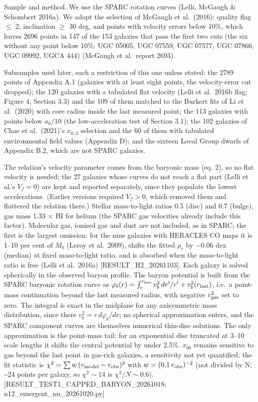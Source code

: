 \documentclass[
  10pt,
]{article}
\begin{document}
Sample and method. We use the SPARC rotation curves (Lelli, McGaugh \& Schombert 2016a). We adopt the selection of McGaugh et al.~(2016): quality flag $\le$ 2, inclination $\ge$ 30 deg, and points with velocity errors below 10\%, which leaves 2696 points in 147 of the 153 galaxies that pass the first two cuts (the six without any point below 10\%: UGC 05005, UGC 07559, UGC 07577, UGC 07866, UGC 09992, UGCA 444) (McGaugh et al.\ report 2693).

Subsamples used later, each a restriction of this one unless stated: the 2789 points of Appendix A.1 (galaxies with at least eight points, the velocity-error cut dropped); the 120 galaxies with a tabulated flat velocity (Lelli et al.~2016b flag; Figure 4, Section 3.3) and the 109 of them matched to the Burkert fits of Li et al.~(2020) with core radius inside the last measured point; the 113 galaxies with points below $a_0/10$ (the low-acceleration test of Section 3.1); the 102 galaxies of Chae et al.~(2021)'s $x_{0,3}$ selection and the 60 of them with tabulated environmental field values (Appendix D); and the sixteen Local Group dwarfs of Appendix B.2, which are not SPARC galaxies.

The relation's velocity parameter comes from the baryonic mass (eq. 2), so no flat velocity is needed; the 27 galaxies whose curves do not reach a flat part (Lelli et al.'s $V_f=0$) are kept and reported separately, since they populate the lowest accelerations. (Earlier versions required $V_f>0$, which removed them and flattered the relation there.) Stellar mass-to-light ratios 0.5 (disc) and 0.7 (bulge), gas mass 1.33 $\times$ HI for helium (the SPARC gas velocities already include this factor). Molecular gas, ionised gas and dust are not included, as in SPARC; the first is the largest omission: for the nine galaxies with HERACLES CO maps it is 1--10 per cent of $M_b$ (Leroy et al.~2009), shifts the fitted $\rho_c$ by $-0.06$ dex (median) at fixed mass-to-light ratio, and is absorbed when the mass-to-light ratio is free (Lelli et al.~2016a) {[}RESULT\_H2\_20261103{]}. Each galaxy is solved spherically in the observed baryon profile. The baryon potential is built from the SPARC baryonic rotation curve as $\varphi_b(r)=\int_r^{r_{\rm last}}v_b^2\,dr'/r'+v_b^2(r_{\rm last})$, i.e.\ a point-mass continuation beyond the last measured radius, with negative $v_{\rm gas}^2$ set to zero. The integral is exact in the midplane for any axisymmetric mass distribution, since there $v_b^2=r\,d\varphi_b/dr$; no spherical approximation enters, and the SPARC component curves are themselves numerical thin-disc solutions. The only approximation is the point-mass tail: for an exponential disc truncated at 3--10 scale lengths it shifts the central potential by under 2.5\%. $x_{b0}$ remains sensitive to gas beyond the last point in gas-rich galaxies, a sensitivity not yet quantified; the fit statistic is $\chi^2=\sum w\,(v_{\rm model}-v_{\rm obs})^2$ with $w=(0.1\,v_{\rm obs})^{-2}$ (not divided by N; \textasciitilde{}24 points per galaxy, so $\chi^2\sim 14$ is $\chi^2/N\sim 0.6$). {[}RESULT\_TEST1\_CAPPED\_BARYON\_20261018; n12\_emergent\_nu\_20261020.py{]}
\end{document}
